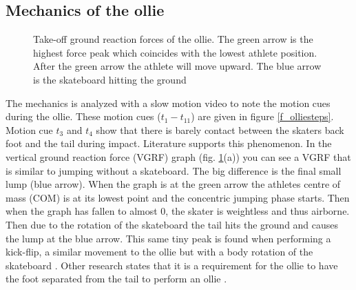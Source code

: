\documentclass[default,iicol]{sn-jnl}
\theoremstyle{thmstyleone}%
\theoremstyle{thmstyletwo}%
\theoremstyle{thmstylethree}%
\begin{document}
\subsection{Mechanics of the ollie} \label{ss_mechanics}

\begin{figure}[b]

\caption[Ollie vertical ground reaction force]{Take-off ground reaction forces of the ollie. The green arrow is the highest force peak which coincides with the lowest athlete position. After the green arrow the athlete will move upward. The blue arrow is the skateboard hitting the ground \cite{frederick_biomechanics_2006}}
\label{f_GRF}
\end{figure}

The mechanics is analyzed with a slow motion video to note the motion cues during the ollie. These motion cues ($t_1-t_{11}$) are given in figure \ref{f_olliesteps}. Motion cue $t_3$ and $t_4$ show that there is barely contact between the skaters back foot and the tail during impact. Literature supports this phenomenon. In the vertical ground reaction force (VGRF) graph (fig. \ref{f_GRF}(a)) you can see a VGRF that is similar to jumping without a skateboard. The big difference is the final small lump (blue arrow). When the graph is at the green arrow the athletes centre of mass (COM) is at its lowest point and the concentric jumping phase starts. Then when the graph has fallen to almost 0, the skater is weightless and thus airborne. Then due to the rotation of the skateboard the tail hits the ground and causes the lump at the blue arrow. This same tiny peak is found when performing a kick-flip, a similar movement to the ollie but with a body rotation of the skateboard \cite{determan_kinetics_2006}. Other research states that it is a requirement for the ollie to have the foot separated from the tail to perform an ollie \cite{nakashima_simulation_2021}. 
\end{document}
